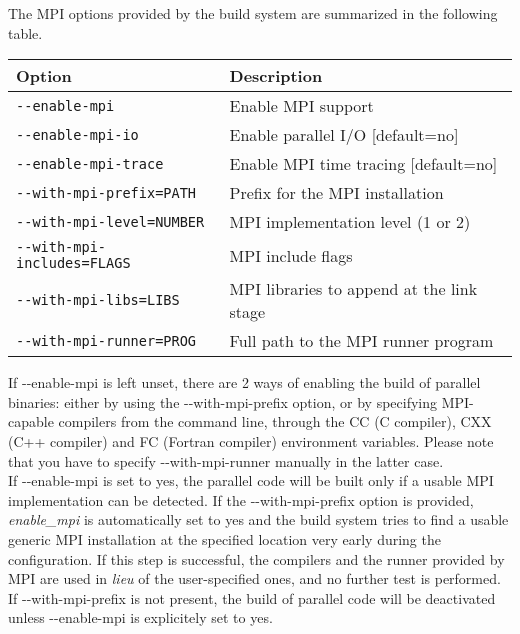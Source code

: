 The MPI options provided by the build system are summarized in the
following table.\\


\begin{center}
\begin{tabular}{|l|l|}
\hline 
\textbf{Option}  & \textbf{Description} \tabularnewline
\hline 
\texttt{-{-}enable-mpi}  & Enable MPI support\tabularnewline
\texttt{-{-}enable-mpi-io}  & Enable parallel I/O {[}default=no{]}\tabularnewline
\texttt{-{-}enable-mpi-trace}  & Enable MPI time tracing {[}default=no{]}\tabularnewline
\hline 
\texttt{-{-}with-mpi-prefix=PATH}  & Prefix for the MPI installation\tabularnewline
\hline 
\texttt{-{-}with-mpi-level=NUMBER} & MPI implementation level (1 or 2)\tabularnewline
\hline 
\texttt{-{-}with-mpi-includes=FLAGS}  & MPI include flags\tabularnewline
\texttt{-{-}with-mpi-libs=LIBS}  & MPI libraries to append at the link stage\tabularnewline
\hline 
\texttt{-{-}with-mpi-runner=PROG}  & Full path to the MPI runner program\tabularnewline
\hline
\end{tabular}
\par\end{center}

If \hbox{-{-}enable-mpi} is left unset, there are 2 ways of enabling
the build of parallel binaries: either by using the \hbox{-{-}with-mpi-prefix}
option, or by specifying MPI-capable compilers from the command line,
through the CC (C compiler), CXX (C++ compiler) and FC (Fortran compiler)
environment variables. Please note that you have to specify \hbox{-{-}with-mpi-runner}
manually in the latter case.\\


If \textquotedbl{}-{-}enable-mpi\textquotedbl{} is set to \textquotedbl{}yes\textquotedbl{},
the parallel code will be built only if a usable MPI implementation
can be detected. If the \textquotedbl{}-{-}with-mpi-prefix\textquotedbl{}
option is provided, \textit{enable\_mpi} is automatically set to \textquotedbl{}yes\textquotedbl{}
and the build system tries to find a usable generic MPI installation
at the specified location very early during the configuration. If
this step is successful, the compilers and the runner provided by
MPI are used in \textit{lieu} of the user-specified ones, and no further
test is performed. If \textquotedbl{}-{-}with-mpi-prefix\textquotedbl{}
is not present, the build of parallel code will be deactivated unless
\textquotedbl{}-{-}enable-mpi\textquotedbl{} is explicitely set
to \textquotedbl{}yes\textquotedbl{}. \\


